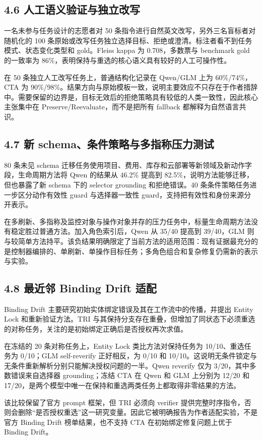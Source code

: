 \documentclass[10.5pt,fontset=none]{ctexart}
\begin{document}
\subsection{4.6 人工语义验证与独立改写}
\par 一名未参与任务设计的志愿者对 50 条指令进行自然英文改写，另外三名盲标者对随机化的 100 条原始或改写任务独立选择目标、拒绝或澄清。标注者看不到任务模式、状态变化类型和 gold。Fleiss kappa 为 0.708，多数票与 benchmark gold 的一致率为 86\%，表明保持与重选的核心语义具有较好的人工可操作性。
\par 在 50 条独立人工改写任务上，普通结构化记录在 Qwen/GLM 上为 60\%/74\%，CTA 为 90\%/98\%。结果方向与原始模板一致，说明主要效应不只存在于作者措辞中。需要保留的边界是，目标无效后的拒绝策略具有较低的人类一致性，因此核心主张集中在 Preserve/Reevaluate，而不是把所有 fallback 都解释为自然语言共识。
\subsection{4.7 新 schema、条件策略与多指称压力测试}
\par 80 条未见 schema 迁移任务使用项目、费用、库存和云部署等新领域及新动作字段，生命周期方法将 Qwen 的结果从 46.2\% 提高到 82.5\%，说明方法能够迁移，但也暴露了新 schema 下的 selector grounding 和拒绝错误。40 条条件策略任务进一步区分动作有效性 guard 与选择器一致性 guard，支持把有效性和身份来源分开表示。
\par 在多刷新、多指称及监控对象与操作对象并存的压力任务中，标量生命周期方法没有稳定胜过普通方法。加入角色索引后，Qwen 从 35/40 提高到 39/40，GLM 则与较简单方法持平。该负结果明确限定了当前方法的适用范围：现有证据最充分的是控制器编排的、单刷新、单操作目标任务；多角色组合和复杂修复仍需新的表示与实验。
\subsection{4.8 最近邻 Binding Drift 适配}
\par Binding Drift 主要研究初始实体绑定错误及其在工作流中的传播，并提出 Entity Lock 和重新验证方法。TRI 与其保持分支存在重叠，但增加了同状态下必须重选的对称任务，关注的是初始绑定正确后是否授权再次求值。
\par 在冻结的 20 条对称任务上，Entity Lock 类比方法对保持任务为 10/10、重选任务为 0/10；GLM self-reverify 正好相反，为 0/10 和 10/10。这说明无条件锁定与无条件重新解析分别只能解决授权问题的一半。Qwen reverify 仅为 3/20，其中多数错误来自选择器 grounding；冻结 CTA 在 Qwen 和 GLM 上分别为 12/20 和 17/20，是两个模型中唯一在保持和重选两类任务上都取得非零结果的方法。
\par 该比较保留了官方 prompt 框架，但 TRI 必须向 verifier 提供完整时序指令，否则会删除“是否授权重选”这一研究变量。因此它被明确报告为作者适配实验，不是官方 Binding Drift 榜单结果，也不支持 CTA 在初始绑定修复问题上优于 Binding Drift。
\end{document}
